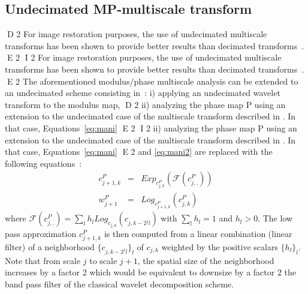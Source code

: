\subsection{Undecimated MP-multiscale transform}
D 2
For image restoration purposes, the use of undecimated multiscale transforms has been shown to provide better results than decimated transforms~\cite{starck:book98,starck:book06}. 
E 2
I 2
For image restoration purposes, the use of undecimated multiscale transforms has been shown to provide better results than decimated transforms~\citep{starck:book98,starck:book06}. 
E 2
The aforementioned modulus/phase multiscale analysis can be extended to an undecimated scheme consisting in~: i) applying an undecimated wavelet transform to the modulus map, 
D 2
ii) analyzing the phase map P using an extension to the undecimated case of the multiscale transform described in \cite{rahman05}. In that case, Equations~\eqref{eq:mani} 
E 2
I 2
ii) analyzing the phase map P using an extension to the undecimated case of the multiscale transform described in \citep{rahman05}. In that case, Equations~\eqref{eq:mani} 
E 2
and \eqref{eq:mani2} are replaced with the following equations~:
\begin{eqnarray}\label{eq:maniu}
c_{j+1,k}^P & = & Exp_{c_{j,k}^P} ( \mathcal{F}(c_{j,.}^P))\\
w_{j+1}^P & = & Log_{c_{j+1,k}^P}\left(c_{j,k}^P\right)  
\end{eqnarray}
where $\mathcal{F}(c_{j,.}^P) = \sum_l h_{l} Log_{c_{j,k}}\left(c_{j,k-2^jl}\right)$ with $\sum_l h_l = 1$ and $h_l > 0$. The low pass 
approximation $c_{j+1,k}^P$ is then computed from a linear combination (linear filter) of a neighborhood $\{c_{j,k-2^jl}\}_l$ of $c_{j,k}$ 
weighted by the positive scalars $\{h_l\}_l$. Note that from scale $j$ to scale $j+1$, the spatial size of the neighborhood increases 
by a factor $2$ which would be equivalent to downsize by a factor $2$ the band pass filter of the classical wavelet decomposition scheme.\\

